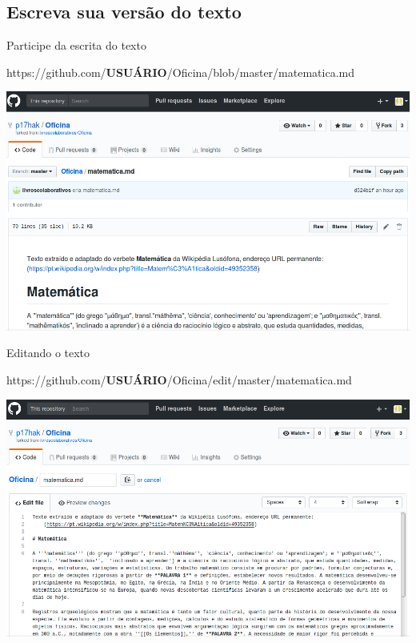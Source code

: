 \documentclass{beamer}
\begin{document}
\subsection{Escreva sua versão do texto}
\begin{frame}{Participe da escrita do texto}
  \begin{center}
    https://github.com/{\bf USUÁRIO}/Oficina/blob/master/matematica.md

    \includegraphics[scale=0.3]{./figs/matematica_GitHub.png}
  \end{center}
\end{frame}

\begin{frame}{Editando o texto}
  \begin{center}
    https://github.com/{\bf USUÁRIO}/Oficina/edit/master/matematica.md

    \includegraphics[scale=0.3]{./figs/editando_GitHub.png}
  \end{center}
\end{frame}
\end{document}
